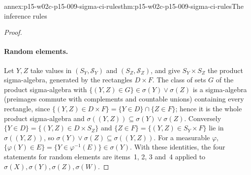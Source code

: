\begin{annexitem}{annex:p15-w02c-p15-009-sigma-ci-rules}{thm:p15-w02c-p15-009-sigma-ci-rules}{The inference rules}
\begin{proof}
\paragraph{Random elements.} Let \(Y,Z\) take values in
\((S_Y,\mathcal S_Y)\) and \((S_Z,\mathcal S_Z)\), and give
\(S_Y\times S_Z\) the product sigma-algebra, generated by the rectangles
\(D\times F\). The class of sets \(G\) of the product sigma-algebra with
\(\{(Y,Z)\in G\}\in\sigma(Y)\vee\sigma(Z)\) is a sigma-algebra (preimages
commute with complements and countable unions) containing every rectangle,
since \(\{(Y,Z)\in D\times F\}=\{Y\in D\}\cap\{Z\in F\}\); hence it is the
whole product sigma-algebra and \(\sigma((Y,Z))\subseteq\sigma(Y)\vee\sigma(Z)\).
Conversely \(\{Y\in D\}=\{(Y,Z)\in D\times S_Z\}\) and
\(\{Z\in F\}=\{(Y,Z)\in S_Y\times F\}\) lie in \(\sigma((Y,Z))\), so
\(\sigma(Y)\vee\sigma(Z)\subseteq\sigma((Y,Z))\). For a measurable
\(\varphi\), \(\{\varphi(Y)\in E\}=\{Y\in\varphi^{-1}(E)\}\in\sigma(Y)\).
With these identities, the four statements for random elements are items~1,
2, 3 and~4 applied to \(\sigma(X),\sigma(Y),\sigma(Z),\sigma(W)\).
\end{proof}
\end{annexitem}

